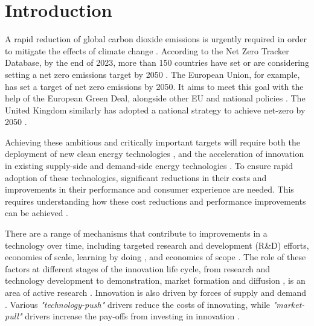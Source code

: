 \documentclass[parskip=full]{article}
\begin{document}
\section{Introduction}
\label{sec:intro}

A rapid reduction of global carbon dioxide emissions is urgently required in order to mitigate the effects of climate change \cite{Forster2019}. According to the Net Zero Tracker Database, by the end of 2023, more than 150 countries have set or are considering setting a net zero emissions target by 2050 \cite{climateaction}. The European Union, for example, has set a target of net zero emissions by 2050. It aims to meet this goal with the help of the European Green Deal, alongside other EU and national policies \cite{eu2020green}. The United Kingdom similarly has adopted a national strategy to achieve net-zero by 2050 \cite{noauthor_ieairena_2023}.

Achieving these ambitious and critically important targets will require both the deployment of new clean energy technologies \cite{iea2020cleanenergy}, and the acceleration of innovation in existing supply-side \cite{sinn2012green} and demand-side energy technologies \cite{rgeVorsatz2009}. To ensure rapid adoption of these technologies, significant reductions in their costs and improvements in their performance and consumer experience are needed. This requires understanding how these cost reductions and performance improvements can be achieved \cite{Stephan2021,Ziegler2021}.

There are a range of mechanisms that contribute to improvements in a technology over time, including targeted research and development (R\&D) efforts, economies of scale, learning by doing \cite{WRIGHT_1936, Arrow_1962}, and economies of scope \cite{johansson2012global, national2016power, iea2020perspectives}. The role of these factors at different stages of the innovation life cycle, from research and technology development to demonstration, market formation and diffusion \cite{grubler2012policies}, is an area of active research  \cite{kavlak2018evaluating, Ziegler2021}. Innovation is also driven by forces of supply and demand \cite{Mowery1979}. Various \textit{"technology-push"} drivers reduce the costs of innovating, while \textit{"market-pull"} drivers increase the pay-offs from investing in innovation \cite{anadon2009policy}.
\end{document}
